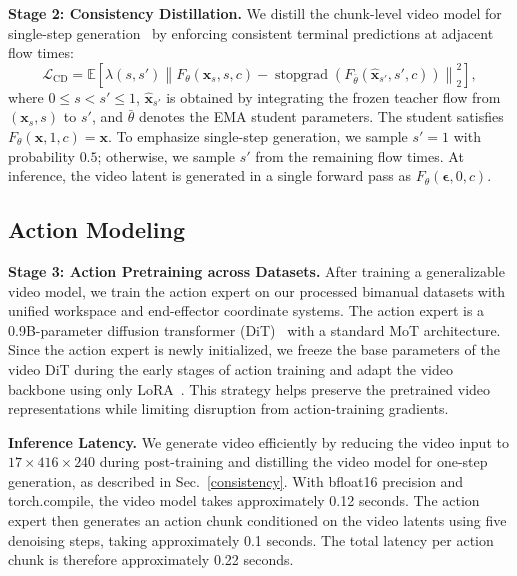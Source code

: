 \medskip
\noindent
\textbf{Stage 2: Consistency Distillation.}\label{consistency}
We distill the chunk-level video model for single-step generation~\citep{song2023consistency}
by enforcing consistent terminal predictions at adjacent flow times:
\begin{equation}
    \mathcal{L}_{\mathrm{CD}}
    =
    \mathbb{E}
    \left[
        \lambda(s,s')
        \left\|
            F_\theta(\mathbf{x}_s,s,c)
            -
            \operatorname{stopgrad}\left(
                F_{\bar{\theta}}(\widehat{\mathbf{x}}_{s'},s',c)
            \right)
        \right\|_2^2
    \right],
\end{equation}
where $0 \leq s < s' \leq 1$,
$\widehat{\mathbf{x}}_{s'}$ is obtained by integrating the frozen
teacher flow from $(\mathbf{x}_s,s)$ to $s'$, and
$\bar{\theta}$ denotes the EMA student parameters.
The student satisfies $F_\theta(\mathbf{x},1,c)=\mathbf{x}$.
To emphasize single-step generation, we sample $s'=1$ with
probability $0.5$;
otherwise, we sample $s'$ from the remaining flow times.
At inference, the video latent is generated in a single forward
pass as $F_\theta(\boldsymbol{\epsilon},0,c)$.



\subsection{Action Modeling}
\textbf{Stage 3: Action Pretraining across Datasets.}
After training a generalizable video model, we train the action expert on our processed bimanual datasets with unified workspace and end-effector coordinate systems. The action expert is a 0.9B-parameter diffusion transformer (DiT)~\citep{peebles2023scalable} with a standard MoT architecture. Since the action expert is newly initialized, we freeze the base parameters of the video DiT during the early stages of action training and adapt the video backbone using only LoRA~\citep{hu2022lora}. This strategy helps preserve the pretrained video representations while limiting disruption from action-training gradients.

\textbf{Inference Latency.}
We generate video efficiently by reducing the video input to \(17\times416 \times 240\) during post-training and distilling the video model for one-step generation, as described in Sec.~\ref{consistency}. With bfloat16 precision and torch.compile, the video model takes approximately 0.12 seconds. The action expert then generates an action chunk conditioned on the video latents using five denoising steps, taking approximately 0.1 seconds. The total latency per action chunk is therefore approximately 0.22 seconds.

